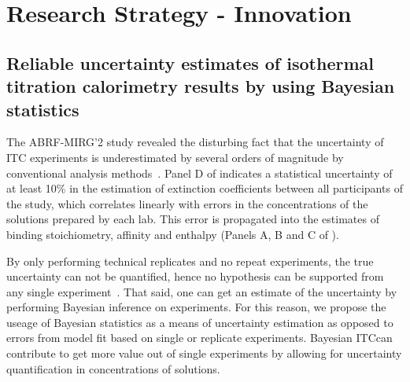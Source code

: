 \documentclass[10pt,final]{article}
\newif\ifinstr
\newcommand{\instr}[1]{\ifdraft{\ifinstr {\color{cyan}\emph{#1}} \fi}{}}
\begin{document}
\section*{Research Strategy - Innovation}
\instr{Explain how your proposal differs from what others have tried.}
\subsection*{Reliable uncertainty estimates of isothermal titration calorimetry results by using Bayesian statistics}
The ABRF-MIRG'2 study revealed the disturbing fact that the uncertainty of ITC experiments is underestimated by several orders of magnitude by conventional analysis methods~\cite{Myszka2003a}. Panel D of  indicates a statistical uncertainty of at least 10\% in the estimation of extinction coefficients between all participants of the study, which correlates linearly with errors in the concentrations of the solutions prepared by each lab. This error is propagated into the estimates of binding stoichiometry, affinity and enthalpy  (Panels A, B and C of ).

By only performing technical replicates  and no repeat experiments, the true uncertainty can not be quantified, hence no hypothesis can be supported from any single experiment~\cite{Vaux2012a}. That said, one can get an estimate of the uncertainty by performing Bayesian inference on experiments. For this reason, we propose the useage of Bayesian statistics as a means of uncertainty estimation as opposed to errors from model fit based on single or replicate experiments. Bayesian ITC\texttrademark can contribute to get more value out of single experiments by allowing for uncertainty quantification in concentrations of solutions. 
\end{document}
